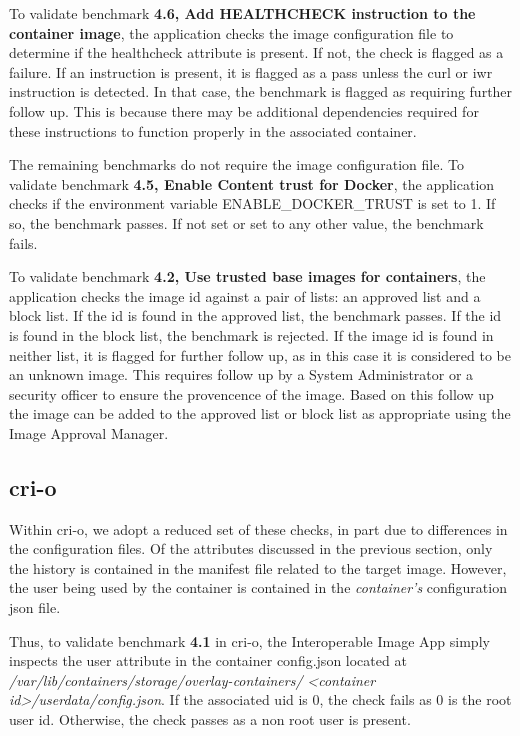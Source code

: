 \documentclass[times, twoside, watermark]{zHenriquesLab-StyleBioRxiv}
\begin{document}
To validate benchmark \textbf{4.6, Add HEALTHCHECK instruction to the container image}, the application checks the image configuration file to determine if the healthcheck attribute is present. If not, the check is flagged as a failure. If an instruction is present, it is flagged as a pass unless the curl or iwr instruction is detected. In that case, the benchmark is flagged as requiring further follow up. This is because there may be additional dependencies required for these instructions to function properly in the associated container.

The remaining benchmarks do not require the image configuration file. To validate benchmark \textbf{4.5, Enable Content trust for Docker}, the application checks if the environment variable ENABLE\_DOCKER\_TRUST is set to 1. If so, the benchmark passes. If not set or set to any other value, the benchmark fails.

To validate benchmark \textbf{4.2, Use trusted base images for containers}, the application checks the image id against a pair of lists: an approved list and a block list. If the id is found in the approved list, the benchmark passes. If the id is found in the block list, the benchmark is rejected. If the image id is found in neither list, it is flagged for further follow up, as in this case it is considered to be an unknown image. This requires follow up by a System Administrator or a security officer to ensure the provencence of the image. Based on this follow up the image can be added to the approved list or block list as appropriate using the Image Approval Manager.

\subsection*{cri-o} Within cri-o, we adopt a reduced set of these checks, in part due to differences in the configuration files. Of the attributes discussed in the previous section, only the history is contained in the manifest file related to the target image. However, the user being used by the container is contained in the \textit{container's} configuration json file.

Thus, to validate benchmark \textbf{4.1} in cri-o, the Interoperable Image App simply inspects the user attribute in the container config.json located at \textit{/var/lib/containers/storage/overlay-containers/}
\textit{<container id>/userdata/config.json}. If the associated uid is 0, the check fails as 0 is the root user id. Otherwise, the check passes as a non root user is present.
\end{document}
